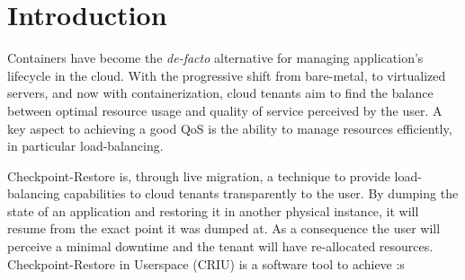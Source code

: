 \section{Introduction} \label{sec:introduction}

Containers have become the \textit{de-facto} alternative for managing application's lifecycle in the cloud.
With the progressive shift from bare-metal, to virtualized servers, and now with containerization, cloud tenants aim to find the balance between optimal resource usage and quality of service perceived by the user.
A key aspect to achieving a good QoS is the ability to manage resources efficiently, in particular load-balancing.

Checkpoint-Restore is, through live migration, a technique to provide load-balancing capabilities to cloud tenants transparently to the user.
By dumping the state of an application and restoring it in another physical instance, it will resume from the exact point it was dumped at.
As a consequence the user will perceive a minimal downtime and the tenant will have re-allocated resources.
Checkpoint-Restore in Userspace (CRIU) is a software tool to achieve :s
